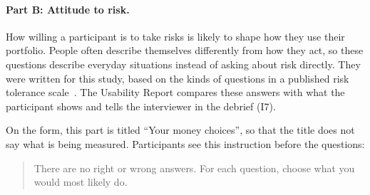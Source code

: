 \documentclass[12pt, titlepage]{article}
\begin{document}
\paragraph{Part B: Attitude to risk.}

How willing a participant is to take risks is likely to shape how they use
their portfolio. People often describe themselves differently from how they
act, so these questions describe everyday situations instead of asking about
risk directly. They were written for this study, based on the kinds of
questions in a published risk tolerance scale~\citep{GrableLytton1999}. The
Usability Report compares these answers with what the participant shows and
tells the interviewer in the debrief (I7).

On the form, this part is titled ``Your money choices'', so that the title
does not say what is being measured. Participants see this instruction before
the questions:

\begin{quote}
There are no right or wrong answers. For each question, choose what you would
most likely do.
\end{quote}
\end{document}
